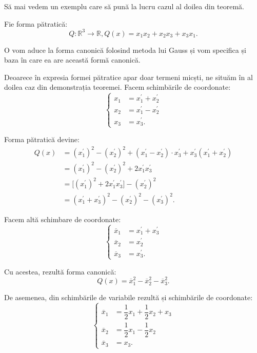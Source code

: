 Să mai vedem un exemplu care să pună la lucru cazul al doilea din teoremă.

\begin{example}
	Fie forma pătratică: 
 \[
	Q : \mathbb{R}^3 \to \mathbb{R}, Q(x) = x_1 x_2 + x_2 x_3 + x_3 x_1.
\]

O vom aduce la forma canonică folosind metoda lui Gauss și vom specifica și
baza în care ea are această formă canonică.

Deoarece în expresia formei pătratice apar doar termeni micști, ne situăm în al
doilea caz din demonstrația teoremei. Facem schimbările de coordonate: 
 \[
	\begin{cases}	
	    x_1 &= x^{\prime}_1 + x^{\prime}_2 \\
	    x_2 &= x^{\prime}_1 - x^{\prime}_2 \\
	    x_3 &= x^{\prime}_3.
    \end{cases}
\]

Forma pătratică devine:
\begin{align*}
Q(x) &= (x^{\prime}_1)^2 - (x^{\prime}_2)^2 + (x^{\prime}_1 - x^{\prime}_2)
        \cdot x^{\prime}_3 + x^{\prime}_3(x^{\prime}_1 + x^{\prime}_2) \\
     &= (x^{\prime}_1)^2 - (x^{\prime}_2)^2 + 2x^{\prime}_1 x^{\prime}_3 \\
     &= \big[ (x^{\prime}_1)^2 + 2x^{\prime}_1 x^{\prime}_3 \big] -
        (x^{\prime}_2)^2 \\
     &= (x^{\prime}_1 + x^{\prime}_3)^2 - (x^{\prime}_2)^2 - (x^{\prime}_3)^2.
\end{align*}

Facem altă schimbare de coordonate: 
 \[
	\begin{cases}	
	    \overline{x}_1 &= x^{\prime}_1 + x^{\prime}_3 \\
	    \overline{x}_2 &= x^{\prime}_2 \\
	    \overline{x}_3 &= x^{\prime}_3.
    \end{cases}
\]

Cu acestea, rezultă forma canonică: 
 \[
	Q(x) = \overline{x}_1^2 - \overline{x}_2^2 - \overline{x}_3^2.
\]

De asemenea, din schimbările de variabile rezultă și schimbările de coordonate: 
 \[
	\begin{cases}	
	    \overline{x}_1 &= \dfrac{1}{2} x_1 + \dfrac{1}{2} x_2 + x_3 \\
	    \overline{x}_2 &= \dfrac{1}{2} x_1 - \dfrac{1}{2} x_2 \\
	    \overline{x}_3 &= x_3.
    \end{cases}
\]
\end{example}

